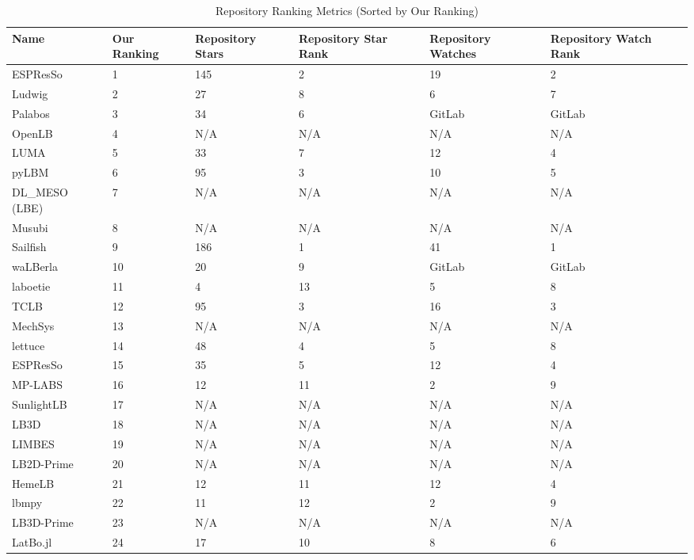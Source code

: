 \documentclass[final, 3p, times, authoryear]{elsarticle}
\newcommand{\esp}{ESPResSo\nolinebreak\hspace{-.05em}\raisebox{.4ex}{\small\bf
+}\nolinebreak\hspace{-.10em}\raisebox{.4ex}{\small\bf +}}
\begin{document}
\begin{table}[ht!]
	\begin{center}
		\begin{tabular}{ p{3cm}p{1.25cm}p{1.75cm}p{1.75cm}p{1.75cm}p{1.75cm} }
			\toprule
			Name & Our Ranking & Repository Stars & Repository Star Rank &
			Repository Watches & Repository Watch Rank\\
			\midrule
			ESPResSo & 1 & 145 & 2 & 19& 2\\
			Ludwig & 2 & 27 & 8 & 6 & 7\\
			Palabos & 3 & 34 & 6 & GitLab & GitLab\\
			OpenLB & 4 & N/A & N/A & N/A& N/A\\
			LUMA & 5 & 33 & 7 & 12 & 4\\
			pyLBM & 6 & 95 & 3 & 10 & 5\\
			DL\_MESO (LBE) & 7 & N/A & N/A & N/A & N/A\\
			Musubi & 8 & N/A & N/A & N/A & N/A\\
			Sailfish & 9 & 186 & 1 & 41& 1\\
			waLBerla & 10 & 20 & 9 & GitLab & GitLab\\
			laboetie & 11 & 4 & 13 & 5 & 8\\
			TCLB & 12 & 95 & 3 & 16 & 3\\
			MechSys & 13 & N/A & N/A & N/A & N/A\\
			lettuce & 14 & 48 & 4 & 5 & 8\\
			\esp & 15 & 35 & 5 & 12 & 4\\
			MP-LABS & 16 & 12 & 11 & 2 & 9\\			
			SunlightLB & 17 & N/A & N/A & N/A & N/A\\
			LB3D & 18 & N/A & N/A & N/A & N/A\\			
			LIMBES & 19 & N/A & N/A & N/A & N/A\\
			LB2D-Prime & 20 & N/A & N/A & N/A & N/A\\		
			HemeLB & 21 & 12 & 11 & 12 & 4\\
			lbmpy & 22 &  11 & 12 & 2 & 9\\	
			LB3D-Prime & 23 & N/A & N/A & N/A & N/A\\	
			LatBo.jl & 24 & 17 & 10 & 8 & 6\\			
			\bottomrule
		\end{tabular}
		\caption{Repository Ranking Metrics (Sorted by Our Ranking)} \label{repometrics}
	\end{center}
\end{table}
\end{document}
